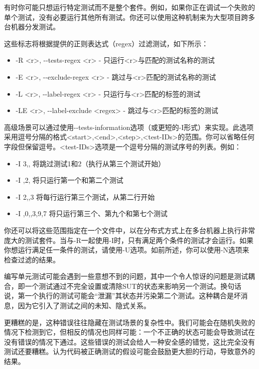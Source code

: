 
有时你可能只想运行特定测试而不是整个套件。例如，如果你正在调试一个失败的单个测试，没有必要运行其他所有测试。你还可以使用这种机制来为大型项目跨多台机器分发测试。

这些标志将根据提供的正则表达式（regex）过滤测试，如下所示：

\begin{itemize}
\item
-R <r>, -{}-tests-regex <r> - 只运行<r>与匹配的测试名称的测试

\item
-E <r>, -{}-exclude-regex <r> - 跳过与<r>匹配的测试名称的测试

\item
-L <r>, -{}-label-regex <r> - 只运行与<r>匹配的标签的测试

\item
 -LE <r>, -{}-label-exclude <regex> - 跳过与<r>匹配的标签的测试
\end{itemize}

高级场景可以通过使用-{}-tests-information选项（或更短的-I形式）来实现。此选项采用逗号分隔的格式<start>,<end>,<step>,<test-IDs>的范围。你可以省略任何字段但保留逗号。<test-IDs>选项是一个逗号分隔的测试序号的列表。例如：

\begin{itemize}
\item
-I 3,, 将跳过测试1和2（执行从第三个测试开始）

\item
-I ,2, 将只运行第一个和第二个测试

\item
-I 2,,3 将每行运行第三个测试，从第二行开始

\item
-I ,0,,3,9,7 将只运行第三个、第九个和第七个测试
\end{itemize}

你还可以将这些范围指定在一个文件中，以在分布式方式上在多台机器上执行非常庞大的测试套件。当与-R一起使用-I时，只有满足两个条件的测试才会运行。如果你想运行满足任一条件的测试，请使用-U选项。如前所述，你可以使用-N选项来检查过滤的结果。


编写单元测试可能会遇到一些意想不到的问题，其中一个令人惊讶的问题是测试耦合，即一个测试通过不完全设置或清除SUT的状态来影响另一个测试。换句话说，第一个执行的测试可能会“泄漏”其状态并污染第二个测试。这种耦合是坏消息，因为它引入了测试之间的未知、隐式关系。

更糟糕的是，这种错误往往隐藏在测试场景的复杂性中。我们可能会在随机失败的情况下检测到它，但相反的情况也同样可能：一个不正确的状态可能会导致测试在没有错误的情况下通过。这些错误的测试会给人一种安全感的错觉，这比完全没有测试还要糟糕。认为代码被正确测试的假设可能会鼓励更大胆的行动，导致意外的结果。

